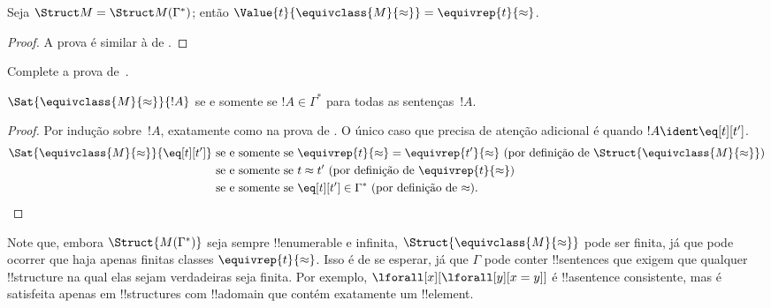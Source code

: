 \documentclass[../../../include/open-logic-section]{subfiles}
\begin{document}
\begin{lem} 
 Seja $\Struct M = \Struct M
 (\Gamma^*)$; então $\Value{t}{\equivclass{M}{\approx}} = \equivrep{t}
 {\approx}$.
\end{lem}
\begin{proof} 
A prova é similar à de .
\end{proof}

\begin{prob}
Complete a prova de~.
\end{prob}

\begin{lem}
$\Sat{\equivclass{M}{\approx}}{!A}$ se e somente se $!A \in \Gamma^*$ para todas as
  sentenças~$!A$.
\end{lem}

\begin{proof}
Por indução sobre~$!A$, exatamente como na prova de .
O único caso que precisa de atenção adicional é quando $!A \ident
\eq[t][t']$.
\begin{align*}
\Sat{\equivclass{M}{\approx}}{\eq[t][t']} & \text{ se e somente se } \equivrep{t}{\approx} = \equivrep{t'}{\approx}
\text{ (por definição de $\Struct{\equivclass{M}{\approx}}$)}\\
& \text{ se e somente se } t \approx t' \text{ (por definição de $\equivrep{t}{\approx}$)}\\
& \text{ se e somente se } \eq[t][t'] \in \Gamma^* \text{ (por definição de $\approx$).}
\end{align*}
\end{proof}

\begin{digress}
Note que, embora $\Struct{M(\Gamma^*)}$ seja sempre !!{enumerable} e
infinita, $\Struct{\equivclass{M}{\approx}}$ pode ser finita, já que
pode ocorrer que haja apenas finitas classes
$\equivrep{t}{\approx}$.  Isso é de se esperar, já que $\Gamma$ pode
conter !!{sentence}s que exigem que qualquer !!{structure} na qual elas
sejam verdadeiras seja finita.  Por exemplo, $\lforall[x][\lforall[y][x =
y]]$ é !!a{sentence} consistente, mas é satisfeita apenas em
!!{structure}s com !!a{domain} que contém exatamente um
!!{element}.
\end{digress}
\end{document}
